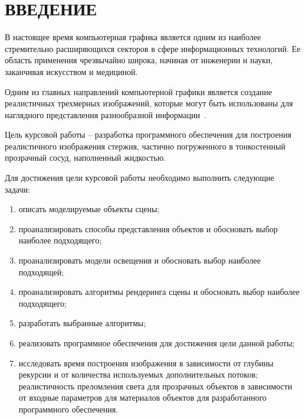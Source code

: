 \section*{ВВЕДЕНИЕ}

В настоящее время компьютерная графика является одним из наиболее стремительно расширяющихся секторов в сфере информационных технологий. Ее область применения чрезвычайно широка, начиная от инженерии и науки, заканчивая искусством и медициной.

Одним из главных направлений компьютерной графики является создание реалистичных трехмерных изображений, которые могут быть использованы для наглядного представления разнообразной информации~\cite{peddie2013history}.

Цель курсовой работы -- разработка программного обеспечения для построения реалистичного изображения стержня, частично погруженного в тонкостенный прозрачный сосуд, наполненный жидкостью.

Для достижения цели курсовой работы необходимо выполнить следующие задачи: 

\begin{enumerate}[label=\arabic*)]
	
	\item описать моделируемые объекты сцены;
	
	\item проанализировать способы представления объектов и обосновать выбор наиболее подходящего;
	
	\item проанализировать модели освещения и обосновать выбор наиболее подходящей;
	
	\item проанализировать алгоритмы рендеринга сцены и обосновать выбор наиболее подходящего;
	
	\item разработать выбранные алгоритмы;
	
	\item реализовать программное обеспечения для достижения цели данной работы;
	
	\item исследовать время построения изображения в зависимости от глубины рекурсии и от количества используемых дополнительных потоков; реалистичность преломления света для прозрачных объектов в зависимости от входные параметров для материалов объектов для разработанного программного обеспечения.
	
\end{enumerate}


